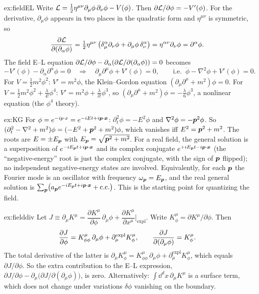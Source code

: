 \documentclass[11pt]{article}
\begin{document}
\begin{solution}{ex:fieldEL}
Write $\mathcal{L}=\tfrac12\eta^{\mu\nu}\partial_\mu\phi\,\partial_\nu\phi-V(\phi)$. Then $\partial\mathcal{L}/\partial\phi=-V'(\phi)$. For the derivative, $\partial_\mu\phi$ appears in two places in the quadratic form and $\eta^{\mu\nu}$ is symmetric, so
\[
 \frac{\partial \mathcal{L}}{\partial (\partial_\alpha\phi)}=\tfrac12\eta^{\mu\nu}\left(\delta^\alpha_\mu\partial_\nu\phi+\partial_\mu\phi\,\delta^\alpha_\nu\right)=\eta^{\alpha\nu}\partial_\nu\phi=\partial^\alpha\phi .
\]
The field E--L equation $\partial\mathcal{L}/\partial\phi-\partial_\alpha(\partial\mathcal{L}/\partial(\partial_\alpha\phi))=0$ becomes
\[
 -V'(\phi)-\partial_\alpha\partial^\alpha\phi=0\quad\Longrightarrow\quad\partial_\mu\partial^\mu\phi+V'(\phi)=0,\qquad\text{i.e. }\ \ddot\phi-\nabla^2\phi+V'(\phi)=0 .
\]
For $V=\tfrac12m^2\phi^2$: $V'=m^2\phi$, the Klein--Gordon equation $(\partial_\mu\partial^\mu+m^2)\phi=0$. For $V=\tfrac12m^2\phi^2+\tfrac\lambda{4!}\phi^4$: $V'=m^2\phi+\tfrac\lambda{3!}\phi^3$, so $(\partial_\mu\partial^\mu+m^2)\phi=-\tfrac\lambda{6}\phi^3$, a nonlinear equation (the $\phi^4$ theory).
\end{solution}

\begin{solution}{ex:KG}
For $\phi=e^{-ip\cdot x}=e^{-iEt+i\bm{p}\cdot\bm{x}}$: $\partial_t^2\phi=-E^2\phi$ and $\nabla^2\phi=-\bm{p}^2\phi$. So $(\partial_t^2-\nabla^2+m^2)\phi=(-E^2+\bm{p}^2+m^2)\phi$, which vanishes iff $E^2=\bm{p}^2+m^2$. The roots are $E=\pm E_{\bm{p}}$ with $E_{\bm{p}}=\sqrt{\bm{p}^2+m^2}$. For a real field, the general solution is a superposition of $e^{-iE_{\bm{p}}t+i\bm{p}\cdot\bm{x}}$ and its complex conjugate $e^{+iE_{\bm{p}}t-i\bm{p}\cdot\bm{x}}$ (the ``negative-energy'' root is just the complex conjugate, with the sign of $\bm{p}$ flipped); no independent negative-energy states are involved. Equivalently, for each $\bm{p}$ the Fourier mode is an oscillator with frequency $\omega_{\bm{p}}=E_{\bm{p}}$, and the real general solution is $\sum_{\bm{p}}\bigl(a_{\bm{p}}e^{-iE_{\bm{p}}t+i\bm{p}\cdot\bm{x}}+\text{c.c.}\bigr)$. This is the starting point for quantizing the field.
\end{solution}

\begin{solution}{ex:fielddiv}
Let $J\equiv\partial_\mu K^\mu=\dfrac{\partial K^\mu}{\partial\phi}\,\partial_\mu\phi+\dfrac{\partial K^\mu}{\partial x^\mu}\Big|_{\text{expl}}$. Write $K^\mu_\phi=\partial K^\mu/\partial\phi$. Then
\[
 \frac{\partial J}{\partial \phi}=K^\mu_{\phi\phi}\,\partial_\mu\phi+\partial^{\text{expl}}_\mu K^\mu_\phi,\qquad
 \frac{\partial J}{\partial (\partial_\mu\phi)}=K^\mu_\phi .
\]
The total derivative of the latter is $\partial_\mu K^\mu_\phi=K^\mu_{\phi\phi}\,\partial_\mu\phi+\partial^{\text{expl}}_\mu K^\mu_\phi$, which equals $\partial J/\partial\phi$. So the extra contribution to the E--L expression, $\partial J/\partial\phi-\partial_\mu\bigl(\partial J/\partial(\partial_\mu\phi)\bigr)$, is zero. Alternatively: $\int\dd^dx\,\partial_\mu K^\mu$ is a surface term, which does not change under variations $\delta\phi$ vanishing on the boundary.
\end{solution}
\end{document}

